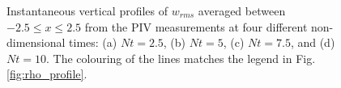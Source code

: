 \documentclass{piv13-abstract}
\newcommand{\figLabel}{Fig. }
\begin{document}
\begin{figure}[h]
\centering
{}
\caption{Instantaneous vertical profiles of $w_{rms}$ averaged between $-2.5 \le x \le 2.5$ from the PIV measurements at four different non-dimensional times: (a) $Nt=2.5$, (b) $Nt=5$, (c) $Nt = 7.5$, and (d) $Nt = 10$. The colouring of the lines matches the legend in \figLabel\ref{fig:rho_profile}. \label{fig:wrms_profile}}
\end{figure}
\end{document}
